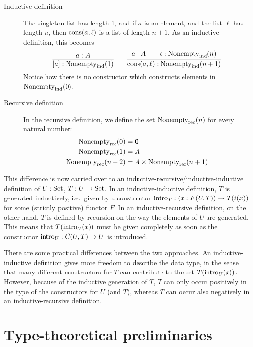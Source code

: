 \documentclass{article}
\begin{document}
\begin{description}
\item[Inductive definition] The singleton list has length 1, and if $a$ is
  an element, and the list $\ell$ has length $n$, then
  $\text{cons}(a, \ell)$ is a list of length $n + 1$. As an inductive
  definition, this becomes
\[
\infer{\singleVec{a} : \Vecind(1)}{a : A} \qquad \infer{\consVec{a}{\ell} :
  \Vecind(n + 1)}{a : A & \quad \ell : \Vecind(n)}
\]
Notice how there is no constructor which constructs elements in
$\text{Nonempty}_{\text{ind}}(0)$.
\item[Recursive definition] In the recursive definition, we define the
  set $\text{Nonempty}_{\text{rec}}(n)$ for every natural number:
  \begin{align*}
    \text{Nonempty}_{\text{rec}}(0) &= \mathbf{0} \\
    \text{Nonempty}_{\text{rec}}(1) &= A \\
    \text{Nonempty}_{\text{rec}}(n + 2) &= A \times \text{Nonempty}_{\text{rec}}(n + 1)
  \end{align*}

\end{description}
%
This difference is now carried over to an
inductive-recursive/inductive-inductive definition of $U : \text{Set}$, $T :
U \to \text{Set}$. In an inductive-inductive definition, $T$ is generated
inductively, i.e.\ given by a constructor $\text{intro}_{T} : (x : F(U, T))
\to T(i(x))$ for some (strictly positive) functor
$F$. %
In an inductive-recursive definition, on the other hand, $T$ is
defined by recursion on the way the elements of $U$ are
generated. This means that $T(\text{intro}_{U}(x))$ must be given completely
as soon as the constructor $\text{intro}_{U} : G(U, T) \to U$ is introduced.

There are some practical differences between the two approaches. An
inductive-inductive definition gives more freedom to describe the data
type, in the sense that many different constructors for $T$ can
contribute to the set $T(\text{intro}_{U}(x))$.  However, because of the
inductive generation of $T$, $T$ can only occur positively in the type
of the constructors for $U$ (and $T$), whereas $T$ can occur also
negatively in an inductive-recursive definition.

\section{Type-theoretical preliminaries}
\label{sec:preliminaries}
\end{document}
